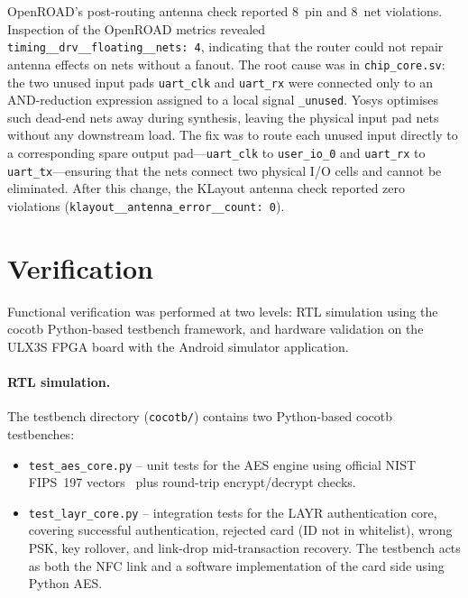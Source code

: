 \documentclass[manuscript,screen,nonacm]{acmart}
\begin{document}
OpenROAD's post-routing antenna check reported 8~pin and 8~net
violations.
Inspection of the OpenROAD metrics revealed \texttt{timing\_\_drv\_\_floating\_\_nets:~4},
indicating that the router could not repair antenna effects on nets
without a fanout.
The root cause was in \texttt{chip\_core.sv}: the two unused input
pads \texttt{uart\_clk} and \texttt{uart\_rx} were connected only to
an AND-reduction expression assigned to a local signal
\texttt{\_unused}.
Yosys optimises such dead-end nets away during synthesis, leaving the
physical input pad nets without any downstream load.
The fix was to route each unused input directly to a corresponding
spare output pad---\texttt{uart\_clk} to \texttt{user\_io\_0} and
\texttt{uart\_rx} to \texttt{uart\_tx}---ensuring that the nets
connect two physical I/O cells and cannot be eliminated.
After this change, the KLayout antenna check reported zero violations
(\texttt{klayout\_\_antenna\_error\_\_count:~0}).

\section{Verification}
\label{sec:verification}

Functional verification was performed at two levels:
RTL simulation using the cocotb Python-based testbench framework,
and hardware validation on the ULX3S FPGA board with the Android
simulator application.

\paragraph{RTL simulation.}
The testbench directory (\texttt{cocotb/}) contains two Python-based
cocotb testbenches:
\begin{itemize}
  \item \texttt{test\_aes\_core.py} – unit tests for the AES engine
        using official NIST FIPS~197 vectors~\cite{fips197} plus
        round-trip encrypt/decrypt checks.
  \item \texttt{test\_layr\_core.py} – integration tests for the LAYR
        authentication core, covering successful authentication,
        rejected card (ID not in whitelist), wrong PSK, key rollover,
        and link-drop mid-transaction recovery.
        The testbench acts as both the NFC link and a software
        implementation of the card side using Python AES.
\end{itemize}
\end{document}
